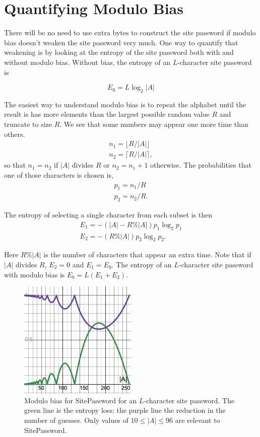\documentclass[11pt, oneside]{article}   	%
\begin{document}
\section{Quantifying Modulo Bias}

There will be no need to use extra bytes to construct the site password if modulo bias doesn't weaken the site password very much.  One way to quantify that weakening is by looking at the entropy of the site password both with and without modulo bias.  Without bias, the entropy of an $L$-character site password is

\begin{equation}
E_0 = L \log_2 |A|
\end{equation}

The easiest way to understand modulo bias is to repeat the alphabet until the result is has more elements than the largest possible random value $R$ and truncate to size $R$.  We see that some numbers may appear one more time than others.
\begin{eqnarray}
n_1 = \lfloor R/|A| \rfloor \\
n_2 = \lceil R/|A| \rceil,
\end{eqnarray}
so that $n_1 = n_2$ if $|A|$ divides $R$ or $n_2 = n_1 + 1$ otherwise.  The probabilities that one of those characters is chosen is, 
\begin{eqnarray}
p_1 = n_1/R \\
p_2 = n_2/R.
\end{eqnarray}

The entropy of selecting a single character from each subset is then
\begin{eqnarray}
E_1 = -(|A| - R\%|A]) p_1 \log_2 p_1 \\ 
E_2 = - (R\%|A|) p_2 \log_2 p_2.
\end{eqnarray}

Here $R\%|A|$ is the number of characters that appear an extra time.  Note that if $|A|$ divides $R$, $E_2 = 0$ and $E_1 = E_0$.  The entropy of an $L$-character site password with modulo bias is $E_b = L(E_1 + E_2)$.  

\begin{figure}
    \centering
    \includegraphics[width=0.5\textwidth]{moduloBias.png} 
    \caption{Modulo bias for SitePassword for an $L$-character site password.  The green line is the entropy loss; the purple line the reduction in the number of guesses.  Only values of $10 \leq |A| \leq 96$ are relevant to SitePassword.}
    \label{fig}
\end{figure}
\end{document}
